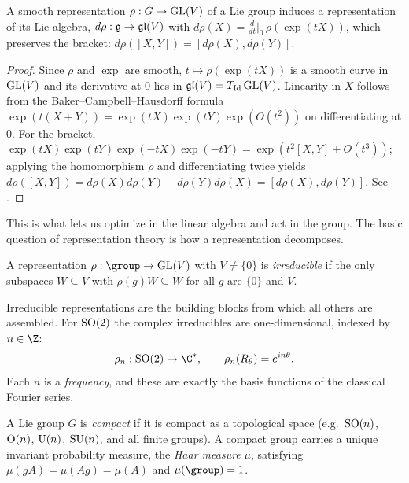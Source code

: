 \begin{proposition}
\label{prop:found:drho}
A smooth representation $\rho : G \to \operatorname{GL}(V)$ of a Lie group induces a
representation of its Lie algebra, $d\rho : \mathfrak{g} \to \mathfrak{gl}(V)$ with
$d\rho(X) = \frac{d}{dt}\big|_0\, \rho(\exp(tX))$, which preserves the bracket:
$d\rho([X,Y]) = [d\rho(X), d\rho(Y)]$.
\end{proposition}

\begin{proof}
Since $\rho$ and $\exp$ are smooth, $t \mapsto \rho(\exp(tX))$ is a smooth curve
in $\operatorname{GL}(V)$ and its derivative at $0$ lies in $\mathfrak{gl}(V) = T_{\mathrm{Id}}\operatorname{GL}(V)$.
Linearity in $X$ follows from the Baker--Campbell--Hausdorff formula $\exp(t(X+Y))
= \exp(tX)\exp(tY)\exp(O(t^2))$ on differentiating at $0$. For the bracket,
$\exp(tX)\exp(tY)\exp(-tX)\exp(-tY) = \exp(t^2[X,Y] + O(t^3))$; applying the
homomorphism $\rho$ and differentiating twice yields
$d\rho([X,Y]) = d\rho(X)d\rho(Y) - d\rho(Y)d\rho(X) = [d\rho(X), d\rho(Y)]$. See
\citep[Thm.~3.28]{Kirillov2008}.
\end{proof}

This is what lets us optimize in the linear algebra and act in the group. The
basic question of representation theory is how a representation decomposes.

\begin{definition}
\label{def:found:irreducible}
A representation $\rho : \group \to \GL(V)$ with $V \ne \{0\}$ is
\emph{irreducible} if the only subspaces $W \subseteq V$ with
$\rho(g)W \subseteq W$ for all $g$ are $\{0\}$ and $V$.
\end{definition}

Irreducible representations are the building blocks from which all others are
assembled. For $\operatorname{SO}(2)$ the complex irreducibles are one-dimensional, indexed by
$n \in \Z$:
\[
  \rho_n : \SO(2) \to \C^*, \qquad \rho_n(R_\theta) = e^{i n\theta}.
\]
Each $n$ is a \emph{frequency}, and these are exactly the basis functions of the
classical Fourier series.

\begin{definition}
\label{def:found:haar}
A Lie group $G$ is \emph{compact} if it is compact as a topological space (e.g.\
$\operatorname{SO}(n)$, $\operatorname{O}(n)$, $\operatorname{U}(n)$, $\operatorname{SU}(n)$, and all finite groups). A compact group
carries a unique invariant probability measure, the \emph{Haar measure} $\mu$,
satisfying $\mu(gA) = \mu(Ag) = \mu(A)$ and $\mu(\group) = 1$.
\end{definition}

